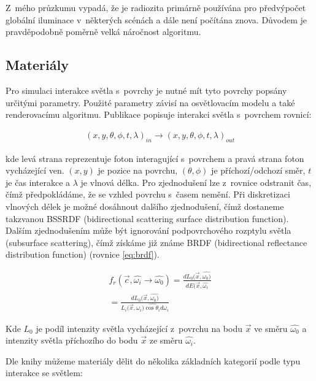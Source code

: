 Z~mého průzkumu vypadá, že je radiozita primárně používána pro předvýpočet globální iluminace v~některých scénách a dále není počítána znova. Důvodem je pravděpodobně poměrně velká náročnost algoritmu.

\subsection{Materiály}
Pro simulaci interakce světla s~povrchy je nutné mít tyto povrchy popsány určitými parametry. Použité parametry závisí na osvětlovacím modelu a také renderovacímu algoritmu. Publikace \cite{materials} popisuje interakci světla s~povrchem rovnicí:

\begin{equation} \label{eq:surface_photon}
	\begin{gathered}
		(x, y, \theta, \phi, t, \lambda)_{in} \xrightarrow{} (x, y, \theta, \phi, t, \lambda)_{out}
	\end{gathered}
\end{equation}

kde levá strana reprezentuje foton interagující s~povrchem a pravá strana foton vycházející ven. $(x, y)$ je pozice na povrchu, $(\theta, \phi)$ je příchozí/odchozí směr, $t$ je čas interakce a $\lambda$ je vlnová délka. Pro zjednodušení lze z~rovnice odstranit čas, čímž předpokládáme, že se vzhled povrchu s~časem nemění. Při diskretizaci vlnových délek je možné dosáhnout dalšího zjednodušení, čímž dostaneme takzvanou BSSRDF (bidirectional scattering surface distribution function). Dalším zjednodušením může být ignorování podpovrchového rozptylu světla (subsurface scattering), čímž získáme již známe BRDF (bidirectional reflectance distribution function) (rovnice \ref{eq:brdf}).

\begin{equation} \label{eq:brdf}
	\begin{gathered}
		f_r(\vec{c}, \hat{\omega_i} \xrightarrow{} \hat{\omega_0}) = \frac{dL_0(\vec{x}, \hat{\omega_0)}}{dE(\vec{x}, \hat{\omega_i}} \\
		= \frac{dL_0(\vec{x}, \hat{\omega_0)}}{L_i(\vec{x}, \hat{\omega_i)\cos \theta_i d\omega_i}}
	\end{gathered}
\end{equation}

Kde $L_0$ je podíl intenzity světla vycházející z~povrchu na bodu $\vec{x}$ ve směru $\hat{\omega_0}$ a intenzity světla příchozího do bodu $\vec{x}$ ze směru $\hat{\omega_i}$.

Dle knihy \cite{hunter_harold_1987} můžeme materiály dělit do několika základních kategorií podle typu interakce se světlem:

